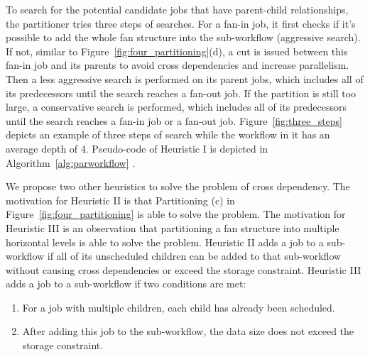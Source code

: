 To search for the potential candidate jobs that have parent-child relationships, the partitioner tries three steps of searches. For a fan-in job, it first checks if it’s possible to add the whole fan structure into the sub-workflow (aggressive search). If not, similar to Figure~\ref{fig:four_partitioning}(d), a cut is issued between this fan-in job and its parents to avoid cross dependencies and increase parallelism. Then a less aggressive search is performed on its parent jobs, which includes all of its predecessors until the search reaches a fan-out job. If the partition is still too large, a conservative search is performed, which includes all of its predecessors until the search reaches a fan-in job or a fan-out job. Figure~\ref{fig:three_steps} depicts an example of three steps of search while the workflow in it has an average depth of 4. Pseudo-code of Heuristic I is depicted in Algorithm~\ref{alg:parworkflow} .


We propose two other heuristics to solve the problem of cross dependency. The motivation for Heuristic II is that Partitioning (c) in Figure~\ref{fig:four_partitioning} is able to solve the problem. The motivation for Heuristic III is an observation that partitioning a fan structure into multiple horizontal levels is able to solve the problem. Heuristic II adds a job to a sub-workflow if all of its unscheduled children can be added to that sub-workflow without causing cross dependencies or exceed the storage constraint. Heuristic III adds a job to a sub-workflow if two conditions are met: 
\begin{enumerate}
\item For a job with multiple children, each child has already been scheduled.
\item After adding this job to the sub-workflow, the data size does not exceed the storage constraint.  
\end{enumerate}

